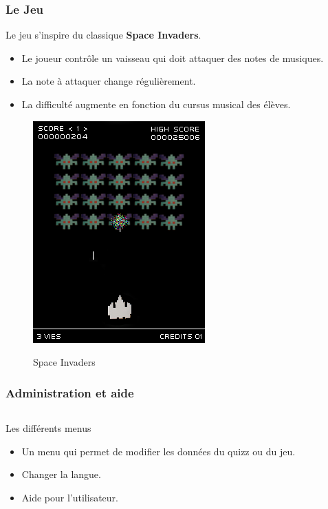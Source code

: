 \begin{frame}
  \frametitle{Le Jeu}
  Le jeu s'inspire du classique \textbf{Space Invaders}.
  \begin{itemize}
    \item Le joueur contrôle un vaisseau qui doit attaquer des notes de musiques.
    \item La note à attaquer change régulièrement.
    \item La difficulté augmente en fonction du cursus musical des élèves.  
  \end{itemize}

  \begin{figure}[!h]
    \centering
    \includegraphics[height = 0.5\textheight]{img/Space_Invaders.png}
    \label{Space Invaders} 
    \caption{Space Invaders}
  \end{figure}
\end{frame}

\begin{frame}
  \frametitle{Administration et aide}
 \begin{columns}[t]
    \begin{column}{10cm}
      \begin{exampleblock}{Les différents menus}
	\begin{itemize}
        \item Un menu qui permet de modifier les données du quizz ou du jeu.
        \item Changer la langue.
        \item Aide pour l'utilisateur.
        \end{itemize}
      \end{exampleblock} 
    \end{column}
  \end{columns}  
\end{frame}
